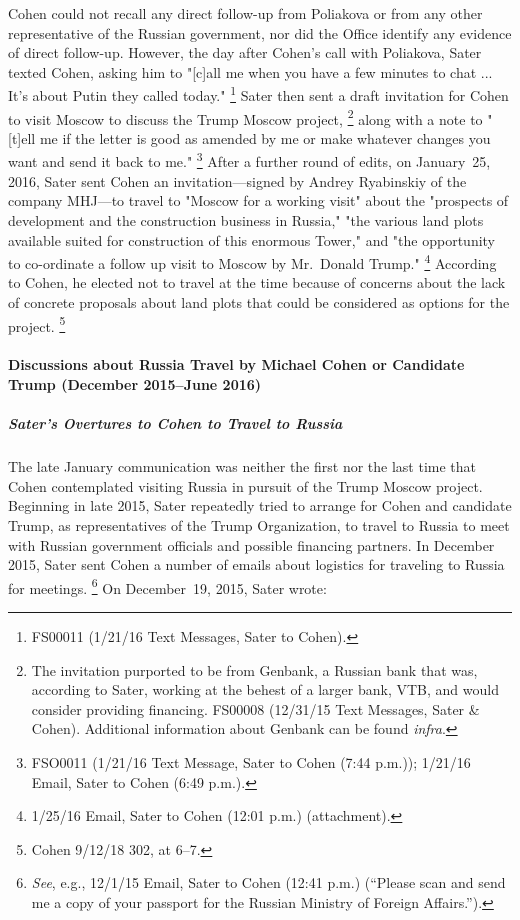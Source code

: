 Cohen could not recall any direct follow-up from Poliakova or from any other representative of the Russian government, nor did the Office identify any evidence of direct follow-up.
However, the day after Cohen's call with Poliakova, Sater texted Cohen, asking him to "[c]all me when you have a few minutes to chat ... It's about Putin they called today."%
\footnote{FS00011 (1/21/16 Text Messages, Sater to Cohen).}
Sater then sent a draft invitation for Cohen to visit Moscow to discuss the Trump Moscow project,%
\footnote{The invitation purported to be from Genbank, a Russian bank that was, according to Sater, working at the behest of a larger bank, VTB, and would consider providing financing.
FS00008 (12/31/15 Text Messages, Sater \& Cohen).
Additional information about Genbank can be found \textit{infra}.}
along with a note to "[t]ell me if the letter is good as amended by me or make whatever changes you want and send it back to me."%
\footnote{FSO0011 (1/21/16 Text Message, Sater to Cohen (7:44 p.m.));
1/21/16 Email, Sater to Cohen (6:49 p.m.).}
After a further round of edits, on January~25, 2016, Sater sent Cohen an invitation---signed by Andrey Ryabinskiy of the company MHJ---to travel to "Moscow for a working visit" about the "prospects of development and the construction business in Russia," "the various land plots available suited for construction of this enormous Tower," and "the opportunity to co-ordinate a follow up visit to Moscow by Mr.~Donald Trump."%
\footnote{1/25/16 Email, Sater to Cohen (12:01 p.m.) (attachment).}
According to Cohen, he elected not to travel at the time because of concerns about the lack of concrete proposals about land plots that could be considered as options for the project.%
\footnote{Cohen 9/12/18 302, at 6--7.}

\paragraph{Discussions about Russia Travel by Michael Cohen or Candidate Trump (December 2015--June 2016)}

\subparagraph{Sater's Overtures to Cohen to Travel to Russia}

The late January communication was neither the first nor the last time that Cohen contemplated visiting Russia in pursuit of the Trump Moscow project.
Beginning in late 2015, Sater repeatedly tried to arrange for Cohen and candidate Trump, as representatives of the Trump Organization, to travel to Russia to meet with Russian government officials and possible financing partners.
In December 2015, Sater sent Cohen a number of emails about logistics for traveling to Russia for meetings.%
\footnote{\textit{See}, e.g., 12/1/15 Email, Sater to Cohen (12:41 p.m.)
(“Please scan and send me a copy of your passport for the Russian Ministry of Foreign Affairs.”).}
On December~19, 2015, Sater wrote:

